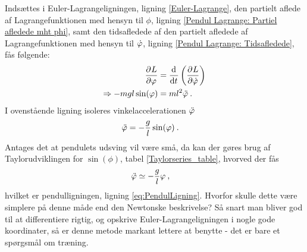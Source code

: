 %
Indsættes i Euler-Lagrangeligningen, ligning \eqref{Euler-Lagrange}, den partielt aflede af Lagrangefunktionen med hensyn til $\phi$, ligning \eqref{Pendul Lagrange: Partiel afledede mht phi}, samt den tidsafledede af den partielt afledede af Lagrangefunktionen med hensyn til $\dot{\varphi}$, ligning \eqref{Pendul Lagrange: Tidsafledede}, fås følgende:
%
\begin{align}
	\frac{\partial^{}{L}}{\partial {\varphi}^{}} &= \frac{\mathrm{d}^{}{}}{{\mathrm{d} {t}}^{}} \left(\frac{\partial^{}{L}}{\partial {\dot{\varphi}}^{}}\right) \nonumber \\
	\Rightarrow - mgl \sin(\varphi) &= m l^2 \ddot{\varphi} \: .
\end{align}
%
I ovenstående ligning isoleres vinkelaccelerationen $\ddot{\varphi}$
%
\begin{align}
	\ddot{\varphi} &= - \frac{g}{l} \sin(\varphi) \: .
\end{align}
%
Antages det at pendulets udsving vil være små, da kan der gøres brug af Taylorudviklingen for $\sin(\phi)$, tabel \ref{Taylorseries_table}, hvorved der fås
%
\begin{align}
	\ddot{\varphi} &\simeq - \frac{g}{l} \varphi \: ,
\end{align}
%
hvilket er pendulligningen, ligning \eqref{eq:PendulLigning}. Hvorfor skulle dette være simplere på denne måde end den Newtonske beskrivelse? Så snart man bliver god til at differentiere rigtig, og opskrive Euler-Lagrangeligningen i nogle gode koordinater, så er denne metode markant lettere at benytte - det er bare et spørgsmål om træning.
%
